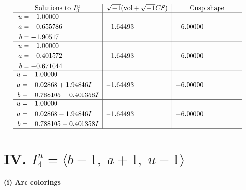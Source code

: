 \documentclass[1p]{elsarticle_modified}
\theoremstyle{definition}
\newcommand{\I}{\sqrt{-1}}
\begin{document}
$$\begin{array}{c|c|c}  
\text{Solutions to }I^u_{3}& \I (\text{vol} + \sqrt{-1}CS) & \text{Cusp shape}\\
 \hline 
\begin{aligned}
u &= \phantom{-}1.00000\phantom{ +0.000000I} \\
a &= -0.655786\phantom{ +0.000000I} \\
b &= -1.90517\phantom{ +0.000000I}\end{aligned}
 & -1.64493\phantom{ +0.000000I} & -6.00000\phantom{ +0.000000I} \\ \hline\begin{aligned}
u &= \phantom{-}1.00000\phantom{ +0.000000I} \\
a &= -0.401572\phantom{ +0.000000I} \\
b &= -0.671044\phantom{ +0.000000I}\end{aligned}
 & -1.64493\phantom{ +0.000000I} & -6.00000\phantom{ +0.000000I} \\ \hline\begin{aligned}
u &= \phantom{-}1.00000\phantom{ +0.000000I} \\
a &= \phantom{-}0.02868 + 1.94846 I \\
b &= \phantom{-}0.788105 + 0.401358 I\end{aligned}
 & -1.64493\phantom{ +0.000000I} & -6.00000\phantom{ +0.000000I} \\ \hline\begin{aligned}
u &= \phantom{-}1.00000\phantom{ +0.000000I} \\
a &= \phantom{-}0.02868 - 1.94846 I \\
b &= \phantom{-}0.788105 - 0.401358 I\end{aligned}
 & -1.64493\phantom{ +0.000000I} & -6.00000\phantom{ +0.000000I}\\
 \hline 
 \end{array}$$\newpage\newpage\renewcommand{\arraystretch}{1}
\centering \section*{IV. $I^u_{4}= \langle b+1,\;a+1,\;u-1 \rangle$}
\flushleft \textbf{(i) Arc colorings}\\
\end{document}
